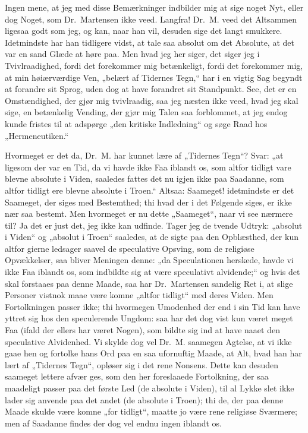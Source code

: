 Ingen mene, at jeg med disse Bemærkninger indbilder mig at sige
noget Nyt, eller dog Noget, som Dr.\ Martensen ikke veed.
Langfra! Dr.\ M. veed det Altsammen ligesaa godt som jeg, og kan,
naar han vil, desuden sige det langt smukkere. Idetmindste har han
tidligere vidst, at tale saa absolut om det Absolute, at det var
en sand Glæde at høre paa. Men hvad jeg her siger, det siger jeg i
Tvivlraadighed, fordi det forekommer mig betænkeligt, fordi det
forekommer mig, at min høiærværdige Ven, „belært af Tidernes
Tegn,“ har i en vigtig Sag begyndt at forandre sit Sprog, uden dog
at have forandret sit Standpunkt. See, det er en Omstændighed, der
gjør mig tvivlraadig, saa jeg næsten ikke veed, hvad jeg skal
sige, en betænkelig Vending, der gjør mig Talen saa forblommet, at
jeg endog kunde fristes til at adspørge „den kritiske Indledning“
og søge Raad hos „Hermeneutiken.“

 Hvormeget er det da, Dr.\ M. har kunnet lære af „Tidernes Tegn“?
Svar: „at ligesom der var en Tid, da vi havde ikke Faa iblandt os,
som altfor tidligt vare blevne absolute i Viden, saaledes fattes
det nu igjen ikke paa Saadanne, som altfor tidligt ere blevne
absolute i Troen.“ Altsaa: Saameget! idetmindste er det Saameget,
der siges med Bestemthed; thi hvad der i det Følgende siges, er
ikke nær saa bestemt. Men hvormeget er nu dette „Saameget“, naar
vi see nærmere til? Ja det er just det, jeg ikke kan udfinde.
Tager jeg de tvende Udtryk: „absolut i Viden“ og „absolut i
Troen“ saaledes, at de sigte paa den Opblæsthed, der kun altfor
gierne ledsager saavel de speculative Opsving, som de religiøse
Opvækkelser, saa bliver Meningen denne: „da Speculationen
herskede, havde vi ikke Faa iblandt os, som indbildte sig at være
speculativt alvidende;“ og hvis det skal forstaaes paa denne
Maade, saa har Dr.\ Martensen sandelig Ret i, at slige Personer
vistnok maae være komne „altfor tidligt“ med deres Viden. Men
Fortolkningen passer ikke; thi hvormegen Umodenhed der end i sin
Tid kan have yttret sig hos den speculerende Ungdom: saa har det
dog vist kun været meget Faa (ifald der ellers har været Nogen),
som bildte sig ind at have naaet den speculative Alvidenhed. Vi
skylde dog vel Dr.\ M. saamegen Agtelse, at vi ikke gaae hen og
fortolke hans Ord paa en saa ufornuftig Maade, at Alt, hvad han
har lært af „Tidernes Tegn“, opløser sig i det rene Nonsens. Dette
kan desuden saameget lettere afvær%
ges, som den her foreslaaede Fortolkning, der saa maadeligt passer
paa det første Led (de absolute i Viden), til al Lykke slet ikke
lader sig anvende paa det andet (de absolute i Troen); thi de, der
paa denne Maade skulde være komne „for tidligt“, maatte jo være
rene religiøse Sværmere; men af Saadanne findes der dog vel endnu
ingen iblandt os.

